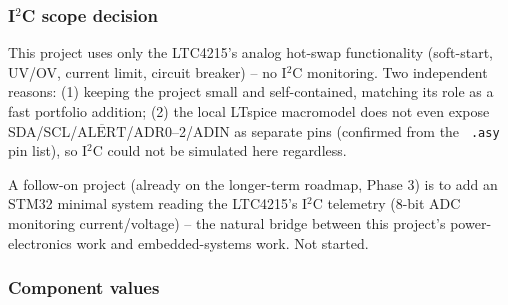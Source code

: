 \documentclass[11pt,letterpaper]{article}
\begin{document}
\subsubsection{I$^2$C scope decision}
\label{sec:scope}

This project uses only the LTC4215's analog hot-swap functionality (soft-start, UV/OV, current limit,
circuit breaker) -- no I$^2$C monitoring. Two independent reasons: (1) keeping the project small and
self-contained, matching its role as a fast portfolio addition; (2) the local LTspice macromodel does not
even expose SDA/SCL/$\overline{\text{ALERT}}$/ADR0--2/ADIN as separate pins (confirmed from the \texttt{
.asy} pin list), so I$^2$C could not be simulated here regardless.

\begin{pending}
A follow-on project (already on the longer-term roadmap, Phase 3) is to add an STM32 minimal system
reading the LTC4215's I$^2$C telemetry (8-bit ADC monitoring current/voltage) -- the natural bridge between
this project's power-electronics work and embedded-systems work. Not started.
\end{pending}

\subsubsection{Component values}
\end{document}
